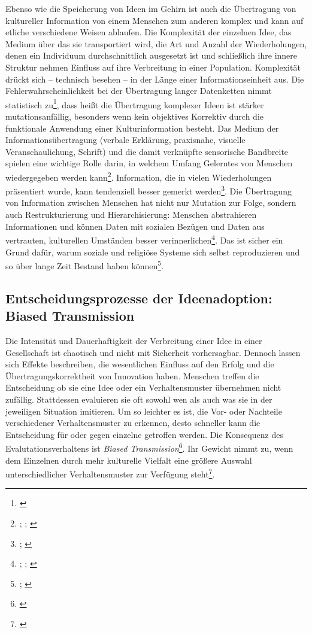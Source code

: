 \documentclass[openany,twoside,twocolumn]{book}
\let\rmarkdownfootnote\footnote%
\def\footnote{\protect\rmarkdownfootnote}
\begin{document}
Ebenso wie die Speicherung von Ideen im Gehirn ist auch die Übertragung von kultureller Information von einem Menschen zum anderen komplex und kann auf etliche verschiedene Weisen ablaufen. Die Komplexität der einzelnen Idee, das Medium über das sie transportiert wird, die Art und Anzahl der Wiederholungen, denen ein Individuum durchschnittlich ausgesetzt ist und schließlich ihre innere Struktur nehmen Einfluss auf ihre Verbreitung in einer Population. Komplexität drückt sich -- technisch besehen -- in der Länge einer Informationseinheit aus. Die Fehlerwahrscheinlichkeit bei der Übertragung langer Datenketten nimmt statistisch zu\footnote{\textcite{eerkens_cultural_2007}}, dass heißt die Übertragung komplexer Ideen ist stärker mutationsanfällig, besonders wenn kein objektives Korrektiv durch die funktionale Anwendung einer Kulturinformation besteht. Das Medium der Informationsübertragung (verbale Erklärung, praxisnahe, visuelle Veranschaulichung, Schrift) und die damit verknüpfte sensorische Bandbreite spielen eine wichtige Rolle darin, in welchem Umfang Gelerntes von Menschen wiedergegeben werden kann\footnote{\textcite{eerkens_cultural_2005}; \textcite{eerkens_practice_2000}; \textcite{eerkens_techniques_2001}}. Information, die in vielen Wiederholungen präsentiert wurde, kann tendenziell besser gemerkt werden\footnote{\textcite{cover_elements_2012}; \textcite{shannon_mathematical_1949}}. Die Übertragung von Information zwischen Menschen hat nicht nur Mutation zur Folge, sondern auch Restrukturierung und Hierarchisierung: Menschen abstrahieren Informationen und können Daten mit sozialen Bezügen und Daten aus vertrauten, kulturellen Umständen besser verinnerlichen\footnote{\textcite{mesoudi_hierarchical_2004}; \textcite{mesoudi_bias_2006}; \textcite{washburn_remembering_2001}}. Das ist sicher ein Grund dafür, warum soziale und religiöse Systeme sich selbst reproduzieren und so über lange Zeit Bestand haben können\footnote{\textcite{kuijt_people_2000}; \textcite{kuijt_place_2001}}.

\hypertarget{biased-transmission}{%
\subsection{Entscheidungsprozesse der Ideenadoption: Biased Transmission}\label{biased-transmission}}

Die Intensität und Dauerhaftigkeit der Verbreitung einer Idee in einer Gesellschaft ist chaotisch und nicht mit Sicherheit vorhersagbar. Dennoch lassen sich Effekte beschreiben, die wesentlichen Einfluss auf den Erfolg und die Übertragungskorrektheit von Innovation haben. Menschen treffen die Entscheidung ob sie eine Idee oder ein Verhaltensmuster übernehmen nicht zufällig. Stattdessen evaluieren sie oft sowohl wen als auch was sie in der jeweiligen Situation imitieren. Um so leichter es ist, die Vor- oder Nachteile verschiedener Verhaltensmuster zu erkennen, desto schneller kann die Entscheidung für oder gegen einzelne getroffen werden. Die Konsequenz des Evalutationsverhaltens ist \emph{Biased Transmission}\footnote{\textcite{henrich_cultural_2001}}. Ihr Gewicht nimmt zu, wenn dem Einzelnen durch mehr kulturelle Vielfalt eine größere Auswahl unterschiedlicher Verhaltensmuster zur Verfügung steht\footnote{\textcite{smith_cultural_1992}}.
\end{document}
